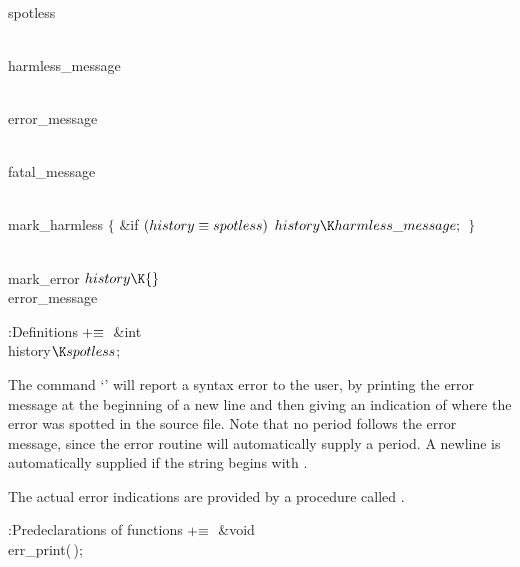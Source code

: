 \Y\B\4\D\\{spotless}\5
\par
\B\4\D\\{harmless\_message}\5
\par
\B\4\D\\{error\_message}\5
\par
\B\4\D\\{fatal\_message}\5
\par
\B\4\D\\{mark\_harmless}\6
${}\{{}$\1\6
\&{if} ${}(\\{history}\equiv\\{spotless}){}$\1\5
${}\\{history}\K\\{harmless\_message};{}$\2\6
\4${}\}{}$\2\par
\B\4\D\\{mark\_error}\5
$\\{history}\K{}$\\{error\_message}\par
\Y\B\4:Definitions\X${}\mathrel+\equiv{}$\6
\&{int} \\{history}${}\K\\{spotless}{}$;\par
\fi

The command `' will report a
syntax error to
the user, by printing the error message at the beginning of a new line and
then giving an indication of where the error was spotted in the source file.
Note that no period follows the error message, since the error routine
will automatically supply a period. A newline is automatically supplied
if the string begins with .

The actual error indications are provided by a procedure called .

\Y\B\4:Predeclarations of functions\X${}\mathrel+\equiv{}$\6
\&{void} \\{err\_print}(\,);\par
\fi

